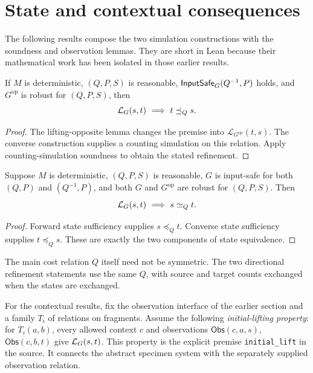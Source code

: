 \section{State and contextual consequences}

The following results compose the two simulation constructions with the
soundness and observation lemmas. They are short in Lean because their
mathematical work has been isolated in those earlier results.

\begin{theorem}
If $M$ is deterministic, $(Q,P,S)$ is reasonable,
$\mathsf{InputSafe}_G(Q^{-1},P)$ holds, and $G^{\mathrm{op}}$ is robust for
$(Q,P,S)$, then
\[
 \mathcal L_G(s,t)\ \Longrightarrow\ t\preceq_Q s.
\]
\end{theorem}
\begin{proof}
The lifting-opposite lemma changes the premise into
$\mathcal L_{G^{\mathrm{op}}}(t,s)$. The converse construction supplies
a counting simulation on this relation. Apply counting-simulation
soundness to obtain the stated refinement.
\end{proof}

\begin{theorem}
Suppose $M$ is deterministic, $(Q,P,S)$ is reasonable, $G$ is
input-safe for both $(Q,P)$ and $(Q^{-1},P)$, and both $G$ and
$G^{\mathrm{op}}$ are robust for $(Q,P,S)$. Then
\[
 \mathcal L_G(s,t)\ \Longrightarrow\ s\simeq_Q t.
\]
\end{theorem}
\begin{proof}
Forward state sufficiency supplies $s\preceq_Q t$. Converse state
sufficiency supplies $t\preceq_Q s$. These are exactly the two
components of state equivalence.
\end{proof}
The main cost relation $Q$ itself need not be symmetric. The two
directional refinement statements use the same $Q$, with source and
target counts exchanged when the states are exchanged.

For the contextual results, fix the observation interface of the earlier
section and a family $T_i$ of relations on fragments. Assume the
following \emph{initial-lifting property}: for $T_i(a,b)$, every
allowed context $c$ and observations
$\mathsf{Obs}(c,a,s)$, $\mathsf{Obs}(c,b,t)$ give $\mathcal L_G(s,t)$.
This property is the explicit premise \texttt{initial\_lift} in the
source. It connects the abstract specimen system with the separately
supplied observation relation.

